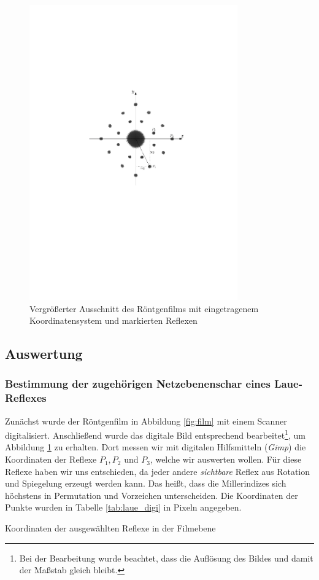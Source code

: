 \documentclass[11pt, a4paper]{article}
\begin{document}
\begin{figure}[h!]
\centering
\includegraphics[width=0.8\textwidth]{./grafiken/film_koord.pdf}
\caption{Vergrößerter Ausschnitt des Röntgenfilms mit eingetragenem Koordinatensystem und markierten Reflexen}
\label{fig:film_koord}
\end{figure}
\FloatBarrier

\subsection{Auswertung}

\subsubsection{Bestimmung der zugehörigen Netzebenenschar eines Laue-Reflexes}
Zunächst wurde der Röntgenfilm in Abbildung \ref{fig:film} mit einem Scanner digitalisiert.
Anschließend wurde das digitale Bild entsprechend bearbeitet\footnote{Bei der Bearbeitung wurde beachtet, dass die Auflösung des Bildes und damit der Maßstab gleich bleibt.}, um Abbildung \ref{fig:film_koord} zu erhalten.
Dort messen wir mit digitalen Hilfsmitteln (\emph{Gimp}) die Koordinaten der Reflexe $P_1, P_2$ und $P_3$, welche wir auswerten wollen.
Für diese Reflexe haben wir uns entschieden, da jeder andere \emph{sichtbare} Reflex aus Rotation und Spiegelung erzeugt werden kann.
Das heißt, dass die Millerindizes sich höchstens in Permutation und Vorzeichen unterscheiden.
Die Koordinaten der Punkte wurden in Tabelle \ref{tab:laue_digi} in Pixeln angegeben.
\begin{table}[h]
\centering

\caption{Koordinaten der ausgewählten Reflexe in der Filmebene}
\label{tab:laue_digi}
\end{table}
\end{document}
